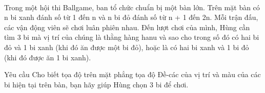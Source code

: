  

Trong một hội thi Ballgame, ban tổ chức chuẩn bị một bàn lớn. Trên mặt bàn có n bi xanh đánh số từ 1 đến n và n bi đỏ đánh số từ n + 1 đến 2n. Mỗi trận đấu, các vận động viên sẽ chơi luân phiên nhau. Đến lượt chơi của mình, Hùng cần tìm 3 bi mà vị trí của chúng là thằng hàng hanu và sao cho trong số đó có hai bi đỏ và 1 bi xanh (khi đó ăn được một bi đỏ), hoặc là có hai bi xanh và 1 bi đỏ (khi đó được ăn 1 bi xanh).

Yêu cầu
Cho biết tọa độ trên mặt phẳng tọa độ Đề-các của vị trí và màu của các bi hiện tại trên bàn, bạn hãy giúp Hùng chọn 3 bi để chơi.